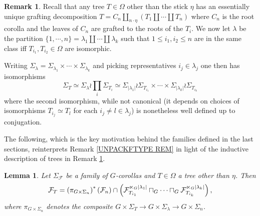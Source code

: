 \documentclass[a4paper,10pt
,draft
]{article}%
\numberwithin{equation}{section}
\numberwithin{figure}{section}
\newtheorem{lemma}[equation]{Lemma}%
\theoremstyle{definition} %
\newtheorem{remark}[equation]{Remark}%
\newcommand{\1}{\ensuremath{\mathbbm 1}}%
\begin{document}
\begin{remark}\label{TREEINDUCDESC REM}
Recall that any tree $T \in \Omega$ other than the stick $\eta$ has an essentially unique grafting decomposition
$T= C_n \amalg_{n \cdot \eta}(T_1 \amalg \cdots \amalg T_n)$ where $C_n$ is the root corolla and the leaves of $C_n$ are grafted to the roots of the $T_i$. We now let 
$\lambda$ be the partition 
$\{1,\cdots,n\} = \lambda_1 \amalg\cdots \amalg \lambda_k$
 such that $1 \leq i_1, i_2 \leq n$ are in the same class iff
 $T_{i_1}, T_{i_2} \in \Omega$ are isomorphic.
 
 Writing 
 $\Sigma_{\lambda} = \Sigma_{\lambda_1} \times \cdots \times
 \Sigma_{\lambda_k}$
and picking representatives $i_j \in \lambda_j$ 
one then has isomorphisms
\[
	\Sigma_T \simeq \Sigma_{\lambda} \wr \prod_{i} \Sigma_{T_i}
		\simeq
	\Sigma_{|\lambda_1|} \wr \Sigma_{T_{i_1}}
		\times \cdots \times	
	\Sigma_{|\lambda_k|} \wr \Sigma_{T_{i_k}}
\]
where the second isomorphism, while not canonical 
(it depends on choices of isomorphisms $T_{i_j} \simeq T_l$ for each $i_j \neq l \in \lambda_j$) is nonetheless well defined up to conjugation.
\end{remark}

The following, which is the key motivation behind the families defined in the last sections,
reinterprets 
Remark \ref{UNPACKFTYPE REM}
in light of the inductive description of trees in
Remark \ref{TREEINDUCDESC REM}.


\begin{lemma}\label{KEYLEMMAGECO LEM}
Let $\Sigma_\mathcal{F}$ be a family of $G$-corollas and 
$T \in \Omega$ a tree other than $\eta$. Then
\begin{equation}\label{KEYLEMMAGECO EQ}
	\mathcal{F}_T =
	\left(\pi_{G \times \Sigma_n}\right)^{\**}(\mathcal{F}_n)
		\cap
	\left(
	\mathcal{F}_{T_{i_1}}^{\ltimes_G |\lambda_1|}
		\sqcap_G \cdots \sqcap_G
	\mathcal{F}_{T_{i_k}}^{\ltimes_G |\lambda_k|}
	\right),
\end{equation}
where $\pi_{G \times \Sigma_n}$ denotes the composite
$G \times \Sigma_T \to G \times \Sigma_{\lambda} \to
 G \times \Sigma_n$.
\end{lemma}
\end{document}
